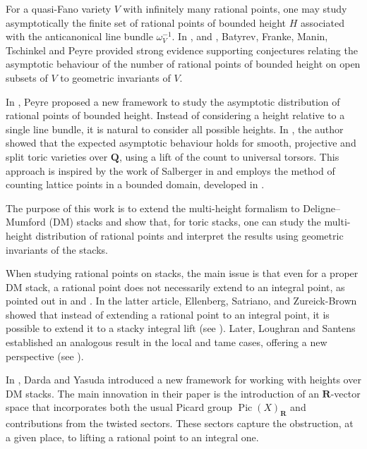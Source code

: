 \documentclass{proc-l}
\newcommand{\R}{\mathbf{R}}
\newcommand{\Q}{\mathbf{Q}}
\DeclareMathOperator{\Pic}{Pic}
\newcommand{\w}{\omega}
\theoremstyle{definition}
\theoremstyle{remark}
\numberwithin{equation}{section}
\begin{document}
For a quasi-Fano variety $V$ with infinitely many rational points, one may study asymptotically the finite set of rational points of bounded height $H$ associated with the anticanonical line bundle $\w_{V}^{-1}$. In \cite{FrankeManinTschinkel1989}, \cite{Batyrev1990} and \cite{peyre_duke}, Batyrev, Franke, Manin, Tschinkel and Peyre provided strong evidence supporting conjectures relating the asymptotic behaviour of the number of rational points of bounded height on open subsets of $V$ to geometric invariants of $V$.

In \cite[Question 4.8]{Peyre_beyond_height}, Peyre proposed a new framework to study the asymptotic distribution of rational points of bounded height. Instead of considering a height relative to a single line bundle, it is natural to consider all possible heights. In \cite[Theorem 1.14]{bongiorno2024multiheightanalysisrationalpoints}, the author showed that the expected asymptotic behaviour holds for smooth, projective and split toric varieties over $\Q$, using a lift of the count to universal torsors. This approach is inspired by the work of Salberger in \cite{salberger_torsor} and employs the method of counting lattice points in a bounded domain, developed in \cite{davenport_geometry_numbers}.

The purpose of this work is to extend the multi-height formalism to Deligne–\allowbreak Mumford (DM) stacks and show that, for toric stacks, one can study the multi-height distribution of rational points and interpret the results using geometric invariants of the stacks.

When studying rational points on stacks, the main issue is that even for a proper DM stack, a rational point does not necessarily extend to an integral point, as pointed out in \cite{dardathesis} and \cite{ellenberg2022heights}. In the latter article, Ellenberg, Satriano, and Zureick-Brown showed that instead of extending a rational point to an integral point, it is possible to extend it to a stacky integral lift (see \cite[Proposition 2.5]{ellenberg2022heights}). Later, Loughran and Santens established an analogous result in the local and tame cases, offering a new perspective (see \cite[Paragraph 4.4]{loughran_santens_malle_conjecture}).


In \cite{darda2024batyrevmanin}, Darda and Yasuda introduced a new framework for working with heights over DM stacks. The main innovation in their paper is the introduction of an $\R$-vector space that incorporates both the usual Picard group $\Pic(X)_{\R}$ and contributions from the twisted sectors. These sectors capture the obstruction, at a given place, to lifting a rational point to an integral one.
\end{document}
